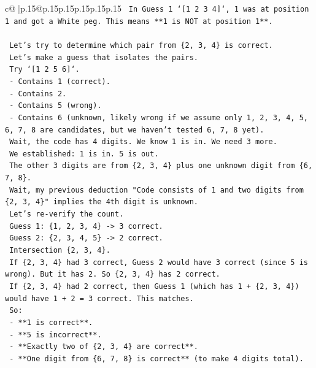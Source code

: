 \documentclass{article}
\begin{document}
{\begin{supertabular}{c@{$\;$}|p{.15\linewidth}@{}p{.15\linewidth}p{.15\linewidth}p{.15\linewidth}p{.15\linewidth}p{.15\linewidth}}
{{{\texttt{    In Guess 1 `{[}1 2 3 4{]}`, 1 was at position 1 and got a White peg. This means **1 is NOT at position 1**.} \\
\\ 
\texttt{    Let's try to determine which pair from \{2, 3, 4\} is correct.} \\
\texttt{    Let's make a guess that isolates the pairs.} \\
\texttt{    Try `{[}1 2 5 6{]}`.} \\
\texttt{    {-} Contains 1 (correct).} \\
\texttt{    {-} Contains 2.} \\
\texttt{    {-} Contains 5 (wrong).} \\
\texttt{    {-} Contains 6 (unknown, likely wrong if we assume only 1, 2, 3, 4, 5, 6, 7, 8 are candidates, but we haven't tested 6, 7, 8 yet).} \\
\texttt{    Wait, the code has 4 digits. We know 1 is in. We need 3 more.} \\
\texttt{    We established: 1 is in. 5 is out.} \\
\texttt{    The other 3 digits are from \{2, 3, 4\} plus one unknown digit from \{6, 7, 8\}.} \\
\texttt{    Wait, my previous deduction "Code consists of 1 and two digits from \{2, 3, 4\}" implies the 4th digit is unknown.} \\
\texttt{    Let's re{-}verify the count.} \\
\texttt{    Guess 1: \{1, 2, 3, 4\} {-}> 3 correct.} \\
\texttt{    Guess 2: \{2, 3, 4, 5\} {-}> 2 correct.} \\
\texttt{    Intersection \{2, 3, 4\}.} \\
\texttt{    If \{2, 3, 4\} had 3 correct, Guess 2 would have 3 correct (since 5 is wrong). But it has 2. So \{2, 3, 4\} has 2 correct.} \\
\texttt{    If \{2, 3, 4\} had 2 correct, then Guess 1 (which has 1 + \{2, 3, 4\}) would have 1 + 2 = 3 correct. This matches.} \\
\texttt{    So:} \\
\texttt{    {-} **1 is correct**.} \\
\texttt{    {-} **5 is incorrect**.} \\
\texttt{    {-} **Exactly two of \{2, 3, 4\} are correct**.} \\
\texttt{    {-} **One digit from \{6, 7, 8\} is correct** (to make 4 digits total).} \\
}}}
\end{supertabular}}
\end{document}
